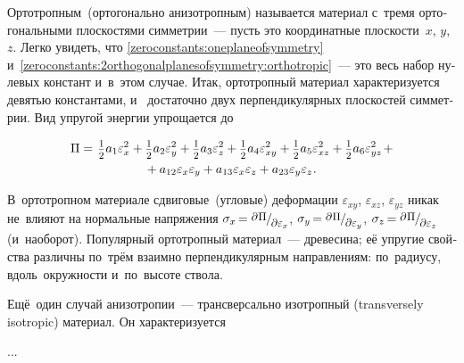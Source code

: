 \begin{otherlanguage}{russian}
Ортотропным~(ортогонально анизотропным) называется материал с~тремя ортогональными плоскостями симметрии~--- пусть это координатные плоскости~$x$, $y$, $z$. Легко увидеть, что \eqref{zeroconstants:oneplaneofsymmetry} и~\eqref{zeroconstants:2orthogonalplanesofsymmetry:orthotropic}~--- это весь набор нулевых констант и~в~этом случае. Итак, ортотропный материал характеризуется девятью константами, и~ достаточно двух перпендикулярных плоскостей симметрии. Вид упругой энергии упрощается до

\nopagebreak\vspace{-0.25em}\begin{multline*}
\Pi =^{\mathstrut^{\mathstrut}} \smalldisplaystyleonehalf a_1 \varepsilon^2_{x} + \smalldisplaystyleonehalf a_2 \varepsilon^2_{y} + \smalldisplaystyleonehalf a_3 \varepsilon^2_{z} + \smalldisplaystyleonehalf a_4 \varepsilon^2_{xy} + \smalldisplaystyleonehalf a_5 \varepsilon^2_{xz} + \smalldisplaystyleonehalf a_6 \varepsilon^2_{yz} \hspace{0.25ex} + \\[-0.1em]
%
+ \hspace{0.5ex} a_{12} \varepsilon_{x} \varepsilon_{y} + a_{13} \varepsilon_{x} \varepsilon_{z} + a_{23} \varepsilon_{y} \varepsilon_{z} \hspace{0.1ex} .
\end{multline*}

В~ортотропном материале сдвиговые~(угловые) деформации $\varepsilon_{xy}$, $\varepsilon_{xz}$, $\varepsilon_{yz}$ никак не~влияют на нормальные напряжения ${\sigma_x \hspace{-0.25ex} = \raisemath{0.16em}{\scalebox{0.88}{$\partial \hspace{0.1ex} \Pi$}} \hspace{-0.1ex} / \hspace{-0.2ex} \raisemath{-0.32em}{\scalebox{0.88}{$\partial \varepsilon_x$}}}$, ${\sigma_y \hspace{-0.25ex} = \raisemath{0.16em}{\scalebox{0.88}{$\partial \hspace{0.1ex} \Pi$}} \hspace{-0.1ex} / \hspace{-0.2ex} \raisemath{-0.32em}{\scalebox{0.88}{$\partial \varepsilon_y$}}}$, ${\sigma_z \hspace{-0.25ex} = \raisemath{0.16em}{\scalebox{0.88}{$\partial \hspace{0.1ex} \Pi$}} \hspace{-0.1ex} / \hspace{-0.2ex} \raisemath{-0.32em}{\scalebox{0.88}{$\partial \varepsilon_z$}}}$ (и~наоборот). Популярный ортотропный материал~--- древесина; её упругие свойства различны по~трём взаимно перпендикулярным направлениям: по~радиусу, вдоль~окружности и~по~высоте ствола.

Ещё~один случай анизотропии~--- трансверсально изотропный (transversely isotropic) материал. Он характеризуется

...



\end{otherlanguage}

